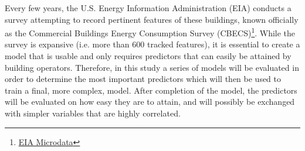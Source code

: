 Every few years, the U.S. Energy Information Administration (EIA) conducts a survey attempting to record pertinent features of these buildings, known officially as the Commercial Buildings Energy Consumption Survey (CBECS)\footnote{\href{https://www.eia.gov/consumption/commercial/data/2012/index.php?view=microdata}{EIA Microdata}}.  While the survey is expansive (i.e. more than 600 tracked features), it is essential to create a model that is usable and only requires predictors that can easily be attained by building operators.  Therefore, in this study a series of models will be evaluated in order to determine the most important predictors which will then be used to train a final, more complex, model.  After completion of the model, the predictors will be evaluated on how easy they are to attain, and will possibly be exchanged with simpler variables that are highly correlated.